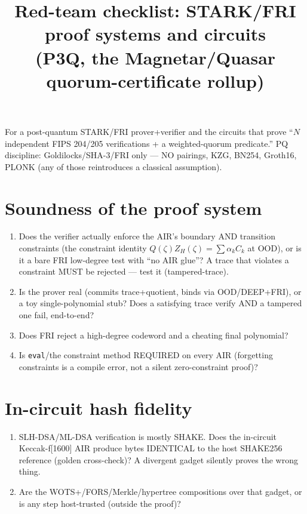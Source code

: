 \documentclass[11pt]{article}
\title{Red-team checklist: STARK/FRI proof systems and circuits\\(P3Q, the Magnetar/Quasar quorum-certificate rollup)}
\date{}
\begin{document}
\maketitle
\noindent For a post-quantum STARK/FRI prover+verifier and the circuits that
prove ``$N$ independent FIPS 204/205 verifications + a weighted-quorum
predicate.'' PQ discipline: Goldilocks/SHA-3/FRI only --- NO pairings, KZG,
BN254, Groth16, PLONK (any of those reintroduces a classical assumption).

\section{Soundness of the proof system}
\begin{enumerate}[leftmargin=*]
  \item Does the verifier actually enforce the AIR's boundary AND transition
    constraints (the constraint identity $Q(\zeta)Z_H(\zeta)=\sum\alpha_k C_k$
    at OOD), or is it a bare FRI low-degree test with ``no AIR glue''? A trace
    that violates a constraint MUST be rejected --- test it (tampered-trace).
  \item Is the prover real (commits trace+quotient, binds via OOD/DEEP+FRI), or
    a toy single-polynomial stub? Does a satisfying trace verify AND a tampered
    one fail, end-to-end?
  \item Does FRI reject a high-degree codeword and a cheating final polynomial?
  \item Is \texttt{eval}/the constraint method REQUIRED on every AIR (forgetting
    constraints is a compile error, not a silent zero-constraint proof)?
\end{enumerate}

\section{In-circuit hash fidelity}
\begin{enumerate}[leftmargin=*]
  \item SLH-DSA/ML-DSA verification is mostly SHAKE. Does the in-circuit
    Keccak-f[1600] AIR produce bytes IDENTICAL to the host SHAKE256 reference
    (golden cross-check)? A divergent gadget silently proves the wrong thing.
  \item Are the WOTS+/FORS/Merkle/hypertree compositions over that gadget, or is
    any step host-trusted (outside the proof)?
\end{enumerate}
\end{document}
